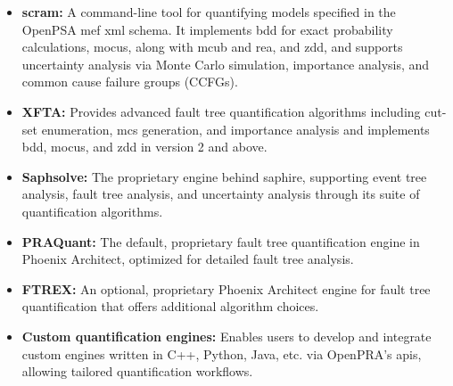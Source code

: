 \begin{itemize}
  \item \textbf{scram:} A command-line tool for quantifying models specified in the OpenPSA \acrshort{mef} \acrshort{xml} schema. It implements \acrshort{bdd} for exact probability calculations, \acrshort{mocus}, along with \acrshort{mcub} and \acrshort{rea}, and \acrshort{zdd}, and supports uncertainty analysis via Monte Carlo simulation, importance analysis, and common cause failure groups (CCFGs).
  \item \textbf{XFTA:} Provides advanced fault tree quantification algorithms including cut-set enumeration, \acrshort{mcs} generation, and importance analysis and implements \acrshort{bdd}, \acrshort{mocus}, and \acrshort{zdd} in version 2 and above.
  \item \textbf{Saphsolve:} The proprietary engine behind \acrshort{saphire}, supporting event tree analysis, fault tree analysis, and uncertainty analysis through its suite of quantification algorithms.
  \item \textbf{PRAQuant:} The default, proprietary fault tree quantification engine in Phoenix Architect, optimized for detailed fault tree analysis.
  \item \textbf{FTREX:} An optional, proprietary Phoenix Architect engine for fault tree quantification that offers additional algorithm choices.
  \item \textbf{Custom quantification engines:} Enables users to develop and integrate custom engines written in C++, Python, Java, etc. via OpenPRA's \acrfull{api}s, allowing tailored quantification workflows.
\end{itemize}

